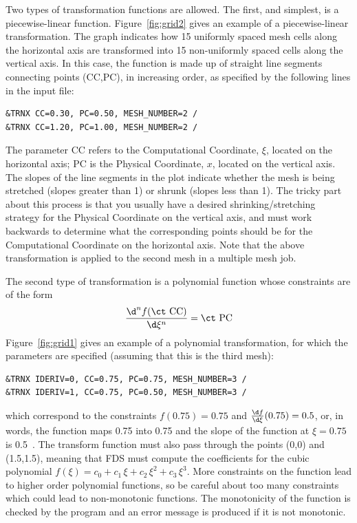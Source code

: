 \documentclass[11pt]{book}
\begin{document}
Two types of transformation functions are allowed. The first, and
simplest, is a piecewise-linear function.
Figure~\ref{fig:grid2} gives an example of a piecewise-linear transformation.
The graph indicates how 15 uniformly spaced mesh cells
along the horizontal axis are transformed into 15 non-uniformly spaced cells along the vertical axis.
In this case, the function is made up of straight line segments
connecting points ({\ct CC},{\ct PC}), in increasing order, as specified by the following lines in the input file:
\begin{lstlisting}
&TRNX CC=0.30, PC=0.50, MESH_NUMBER=2 /
&TRNX CC=1.20, PC=1.00, MESH_NUMBER=2 /
\end{lstlisting}
The parameter {\ct CC} refers to the Computational Coordinate, $\xi$, located
on the horizontal axis; {\ct PC} is the Physical Coordinate, $x$, located on
the vertical axis.  The slopes of the
line segments in the plot indicate whether the mesh is being stretched (slopes greater
than 1) or shrunk (slopes less than 1). The tricky part about this
process is that you usually have a desired shrinking/stretching strategy
for the Physical Coordinate on the vertical axis, and must work backwards
to determine what the corresponding points should be for the Computational
Coordinate on the horizontal axis. Note that the above transformation is
applied to the second mesh in a multiple mesh job.

The second type of transformation is
a polynomial function whose constraints are of the form
\[ \frac{\d^n f(\hbox{\ct CC})}{\d\xi^n} = \hbox{\ct PC}   \]
Figure~\ref{fig:grid1} gives an example of a polynomial transformation, for which
the parameters are specified (assuming that this is the third mesh):
\begin{lstlisting}
&TRNX IDERIV=0, CC=0.75, PC=0.75, MESH_NUMBER=3 /
&TRNX IDERIV=1, CC=0.75, PC=0.50, MESH_NUMBER=3 /
\end{lstlisting}
which correspond to the constraints
$f(0.75)=0.75$ and $\frac{\d f}{\d \xi}(0.75) = 0.5$, or, in words, the
function maps 0.75 into 0.75 and the slope of the function at
$\xi=0.75$ is 0.5~.
The transform function must also pass through the points (0,0) and (1.5,1.5), meaning that
FDS must compute the coefficients for the
cubic polynomial $f(\xi) = c_0 + c_1 \, \xi + c_2 \, \xi^2 + c_3 \, \xi^3$.
More constraints on the function lead to higher order polynomial functions, so be careful about too many constraints which could lead
to non-monotonic functions.
The monotonicity of the function is checked by the
program and an error message is produced if it is not monotonic.
\end{document}
